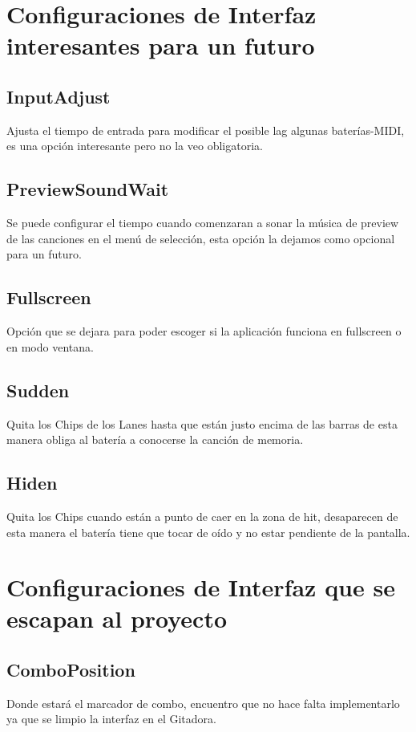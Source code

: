 \documentclass[a4paper,11pt,oneside]{book}
\begin{document}
\section{Configuraciones de Interfaz interesantes para un futuro}

\subsection{InputAdjust}
Ajusta el tiempo de entrada para modificar el posible lag algunas baterías-MIDI, es una opción interesante pero no la veo obligatoria.

\subsection{PreviewSoundWait}
Se puede configurar el tiempo cuando comenzaran a sonar la música de preview de las canciones en el menú de selección, esta opción la dejamos como opcional para un futuro.

\subsection{Fullscreen}
Opción que se dejara para poder escoger si la aplicación funciona en fullscreen o en modo ventana.


\subsection{Sudden}
Quita los \gls{Chips} de los \gls{Lanes} hasta que están justo encima de las barras de esta manera obliga al batería a conocerse la canción de memoria. 


\subsection{Hiden}
Quita los \gls{Chips} cuando están a punto de caer en la zona de hit, desaparecen de esta manera el batería tiene que tocar de oído y no estar pendiente de la pantalla.

\section{Configuraciones de Interfaz que se escapan al proyecto}

\subsection{ComboPosition}
Donde estará el marcador de combo, encuentro que no hace falta implementarlo ya que se limpio la interfaz en el Gitadora.
\end{document}
